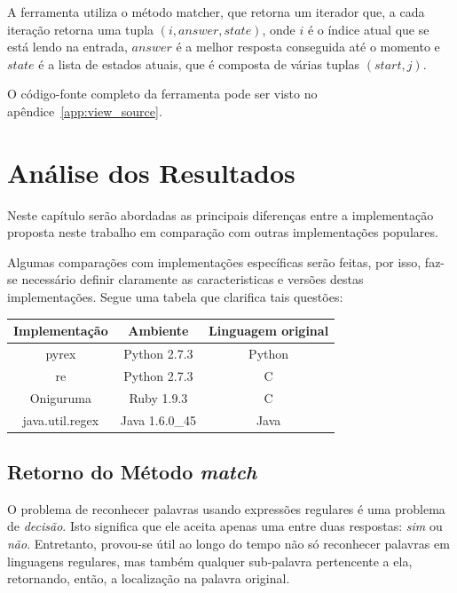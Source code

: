 \documentclass[a4paper,12pt,oneside,onecolumn]{uerj}
\begin{document}
A ferramenta utiliza o método matcher, que retorna um iterador que, a cada iteração retorna uma tupla $(i, answer, state)$, onde $i$ é o índice atual que se está lendo na entrada, $answer$ é a melhor resposta conseguida até o momento e $state$ é a lista de estados atuais, que é composta de várias tuplas $(start, j)$.

O código-fonte completo da ferramenta pode ser visto no apêndice~\ref{app:view_source}.

\chapter{Análise dos Resultados}

Neste capítulo serão abordadas as principais diferenças entre a implementação proposta neste trabalho em comparação com outras implementações populares.

Algumas comparações com implementações específicas serão feitas, por isso, faz-se necessário definir claramente as caracteristicas e versões destas implementações. Segue uma tabela que clarifica tais questões:

\begin{center}
	\begin{tabular}{ c | c | c }
		{\bf Implementação} & {\bf Ambiente} & {\bf Linguagem original} \\
		\hline 
		pyrex & Python 2.7.3 & Python \\
		re & Python 2.7.3 & C \\
		Oniguruma & Ruby 1.9.3 & C \\
		java.util.regex & Java 1.6.0\_45 & Java \\
	\end{tabular}
\end{center}


\section{Retorno do Método \emph{match}}

O problema de reconhecer palavras usando expressões regulares é uma problema de \emph{decisão}. Isto significa que ele aceita apenas uma entre duas respostas: \emph{sim} ou \emph{não}. Entretanto, provou-se útil ao longo do tempo não só reconhecer palavras em linguagens regulares, mas também qualquer sub-palavra pertencente a ela, retornando, então, a localização na palavra original.
\end{document}
